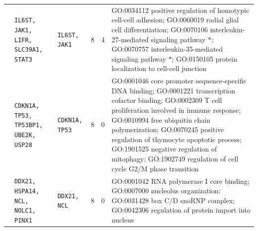 \begin{table}[!htbp]
{\begin{tabular}{r p{} p{} r r p{}}
\addlinespace
3710 & \texttt{IL6ST, JAK1, LIFR, SLC39A1, STAT3} & \texttt{IL6ST, JAK1} & 8 & 4 & GO:0034112 positive regulation of homotypic cell-cell adhesion; GO:0060019 radial glial cell differentiation; GO:0070106 interleukin-27-mediated signaling pathway $\ast$; GO:0070757 interleukin-35-mediated signaling pathway $\ast$; GO:0150105 protein localization to cell-cell junction \\
\addlinespace
5036 & \texttt{CDKN1A, TP53, TP53BP1, UBE2K, USP28} & \texttt{CDKN1A, TP53} & 8 & 0 & GO:0001046 core promoter sequence-specific DNA binding; GO:0001221 transcription cofactor binding; GO:0002309 T cell proliferation involved in immune response; GO:0010994 free ubiquitin chain polymerization; GO:0070245 positive regulation of thymocyte apoptotic process; GO:1901525 negative regulation of mitophagy; GO:1902749 regulation of cell cycle G2/M phase transition \\
\addlinespace
4150 & \texttt{DDX21, HSPA14, NCL, NOLC1, PINX1} & \texttt{DDX21, NCL} & 8 & 0 & GO:0001042 RNA polymerase I core binding; GO:0007000 nucleolus organization; GO:0031428 box C/D snoRNP complex; GO:0042306 regulation of protein import into nucleus \\
\bottomrule
\end{tabular}}
\end{table}
